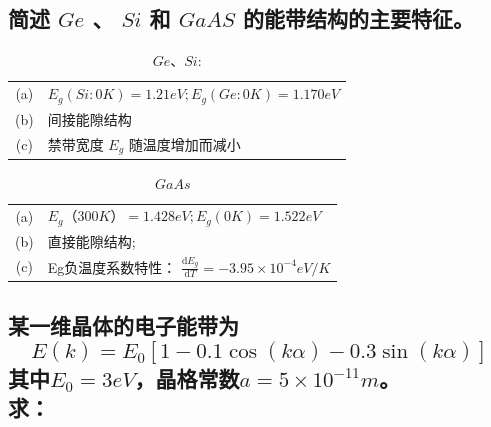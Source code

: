 \documentclass[UTF8]{ctexart}   %
\begin{document}
\clearpage                      %

\subsection{简述 $ Ge $ 、 $ Si $ 和 $ GaAS $ 的能带结构的主要特征。}

\begin{table}[h]
    \caption{ $Ge$、$Si$:}     
    \begin{tabular}{ c l }
    
        (a) & $E_{g} (Si:0K) = 1.21 eV ; E_{g} (Ge:0K) = 1.170 eV $\\
        (b) & 间接能隙结构 \\
        (c) & 禁带宽度 $ E_{g} $ 随温度增加而减小   
 
    \end{tabular}

\end{table}

\begin{table}[h]
    \caption{ $ GaAs $ }        %
    \begin{tabular}{ c l }
        (a) & $E_{g}（ 300 K）= 1.428 eV ;    E_{g} ( 0 K ) = 1.522 eV $ \\
        (b) & 直接能隙结构;\\
        (c) & Eg负温度系数特性： $ \frac{ \mathrm{d} E_{g} }{ \mathrm{d} T }  = -3.95 \times 10 ^{-4}eV/K$

    \end{tabular}
\end{table}

\clearpage                      %

\subsection{
    某一维晶体的电子能带为
\begin{equation*}
    E(k) = E_{0}[ 1 - 0.1 \cos( k \alpha ) - 0.3 \sin( k \alpha )]
\end{equation*} 
其中$E_{0} = 3 eV $，晶格常数$ a = 5 \times 10^{-11} m $。\\
求：}

\end{document}
